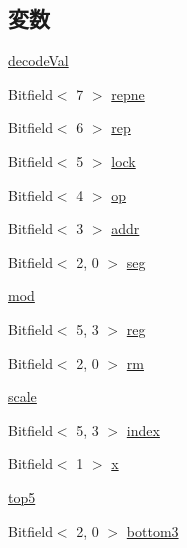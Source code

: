 \subsection*{変数}
\begin{DoxyCompactItemize}
\item 
\hyperlink{namespaceX86ISA_aa86c67710ff4238df8ccfd914fbb517e}{decodeVal}
\item 
Bitfield$<$ 7 $>$ \hyperlink{namespaceX86ISA_a333fa971e94172a30de22915a2fa082b}{repne}
\item 
Bitfield$<$ 6 $>$ \hyperlink{namespaceX86ISA_a56faadad3bfaff70d294dade82311b3b}{rep}
\item 
Bitfield$<$ 5 $>$ \hyperlink{namespaceX86ISA_a2b51fd33fa473b8873c72ebfd8b410f9}{lock}
\item 
Bitfield$<$ 4 $>$ \hyperlink{namespaceX86ISA_ac120faf051fe003563eb1b3ece78528c}{op}
\item 
Bitfield$<$ 3 $>$ \hyperlink{namespaceX86ISA_ab705917f60c5566f9ce56a93f798b2e2}{addr}
\item 
Bitfield$<$ 2, 0 $>$ \hyperlink{namespaceX86ISA_a93006a29bcdfcda7fdda27c7deec6618}{seg}
\item 
\hyperlink{namespaceX86ISA_a4b97eb97db2365148a5c3a5070f0cdd1}{mod}
\item 
Bitfield$<$ 5, 3 $>$ \hyperlink{namespaceX86ISA_aeeb02ad833ab76f3430553ef93213a6b}{reg}
\item 
Bitfield$<$ 2, 0 $>$ \hyperlink{namespaceX86ISA_a7244bd0e5dc7ef7a4db0febe6e585746}{rm}
\item 
\hyperlink{namespaceX86ISA_acec6d8ad52a28972fa74e071c1a63b6a}{scale}
\item 
Bitfield$<$ 5, 3 $>$ \hyperlink{namespaceX86ISA_aa7f971ede8ba06dbd8a605007eda1c6f}{index}
\item 
Bitfield$<$ 1 $>$ \hyperlink{namespaceX86ISA_ab5f9a01fc40e47853ae9551b008afcbd}{x}
\item 
\hyperlink{namespaceX86ISA_ad80576557e55705271049f6a96ef70d4}{top5}
\item 
Bitfield$<$ 2, 0 $>$ \hyperlink{namespaceX86ISA_a6aabe00ec8c89330ec7e272c2145bc87}{bottom3}
\end{DoxyCompactItemize}


